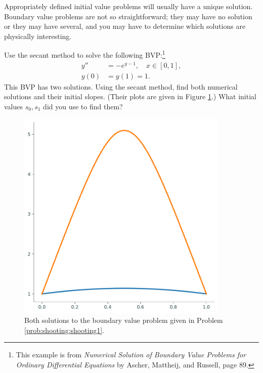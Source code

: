 
\begin{problem}
\label{prob:shooting:shooting1}
Appropriately defined initial value problems will usually have a unique solution.
Boundary value problems are not so straightforward; they may have no solution or they may have several, and you may have to determine which solutions are physically interesting.

Use the secant method to solve the following BVP:\footnote{This example is from \textit{Numerical Solution of Boundary Value Problems for Ordinary Differential Equations} by Ascher, Mattheij, and Russell, page 89.}
\begin{equation*}
\begin{split}
y'' &= -e^{y-1}, \quad x \in [0,1],\\
y(0) &=y(1) =1.
\end{split}
\end{equation*}
This BVP has two solutions.
Using the secant method, find both numerical solutions and their initial slopes.
(Their plots are given in Figure \ref{fig:shooting:shooting1}.)
What initial values $s_0, s_1$ did you use to find them?
\end{problem}

\begin{figure}[H]
\includegraphics[height=4in]{figures/problem1.pdf}
\caption{Both solutions to the boundary value problem given in Problem \ref{prob:shooting:shooting1}.}
\label{fig:shooting:shooting1}
\end{figure}

